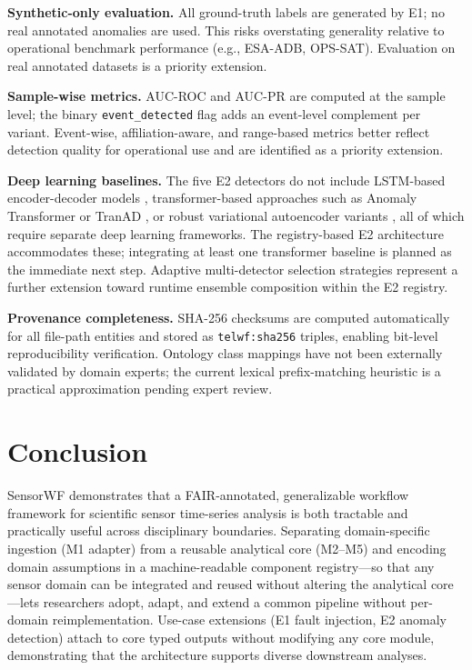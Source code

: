 \documentclass[conference]{IEEEtran}
\begin{document}
\textbf{Synthetic-only evaluation.} All ground-truth labels are generated by E1; no real annotated anomalies are used. This risks overstating generality relative to operational benchmark performance (e.g., ESA-ADB, OPS-SAT). Evaluation on real annotated datasets is a priority extension.

\textbf{Sample-wise metrics.} AUC-ROC and AUC-PR are computed at the sample level; the binary \texttt{event\_detected} flag adds an event-level complement per variant. Event-wise, affiliation-aware, and range-based metrics \cite{esa_adb2024,lavin2015nab} better reflect detection quality for operational use and are identified as a priority extension.

\textbf{Deep learning baselines.} The five E2 detectors do not include LSTM-based encoder-decoder models \cite{malhotra2016lstm}, transformer-based approaches such as Anomaly Transformer \cite{xu2022anomalytransformer} or TranAD \cite{tuli2022tranad}, or robust variational autoencoder variants \cite{rvaest2025,streamvae2025}, all of which require separate deep learning frameworks. The registry-based E2 architecture accommodates these; integrating at least one transformer baseline is planned as the immediate next step. Adaptive multi-detector selection strategies \cite{ramses2026} represent a further extension toward runtime ensemble composition within the E2 registry.

\textbf{Provenance completeness.} SHA-256 checksums are computed automatically for all file-path entities and stored as \texttt{telwf:sha256} triples, enabling bit-level reproducibility verification. Ontology class mappings have not been externally validated by domain experts; the current lexical prefix-matching heuristic is a practical approximation pending expert review.

\section{Conclusion}
\label{sec:conclusion}

SensorWF demonstrates that a FAIR-annotated, generalizable workflow framework for scientific sensor time-series analysis is both tractable and practically useful across disciplinary boundaries. Separating domain-specific ingestion (M1 adapter) from a reusable analytical core (M2--M5) and encoding domain assumptions in a machine-readable component registry---so that any sensor domain can be integrated and reused without altering the analytical core---lets researchers adopt, adapt, and extend a common pipeline without per-domain reimplementation. Use-case extensions (E1 fault injection, E2 anomaly detection) attach to core typed outputs without modifying any core module, demonstrating that the architecture supports diverse downstream analyses.
\end{document}
